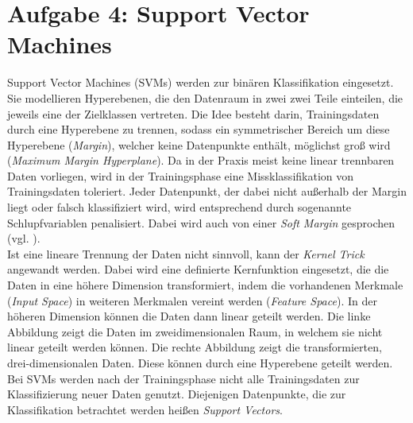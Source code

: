 \section{Aufgabe 4: Support Vector Machines}
Support Vector Machines (SVMs) werden zur binären Klassifikation eingesetzt. Sie modellieren Hyperebenen, die den Datenraum in zwei zwei Teile einteilen, die jeweils eine der Zielklassen vertreten. Die Idee besteht darin, Trainingsdaten durch eine Hyperebene zu trennen, sodass ein symmetrischer Bereich um diese Hyperebene (\emph{Margin}), welcher keine Datenpunkte enthält, möglichst groß wird (\emph{Maximum Margin Hyperplane}). Da in der Praxis meist keine linear trennbaren Daten vorliegen, wird in der Trainingsphase eine Missklassifikation von Trainingsdaten toleriert. Jeder Datenpunkt, der dabei nicht außerhalb der Margin liegt oder falsch klassifiziert wird, wird entsprechend durch sogenannte Schlupfvariablen penalisiert. Dabei wird auch von einer \emph{Soft Margin} gesprochen (vgl. \cite{2015_aggarwal}).\\
\noindent \hspace*{7mm}
Ist eine lineare Trennung der Daten nicht sinnvoll, kann der \emph{Kernel Trick} angewandt werden. Dabei wird eine definierte Kernfunktion eingesetzt, die die Daten in eine höhere Dimension transformiert, indem die vorhandenen Merkmale (\emph{Input Space}) in weiteren Merkmalen vereint werden (\emph{Feature Space}). In der höheren Dimension können die Daten dann linear geteilt werden.%
 Die linke Abbildung zeigt die Daten im zweidimensionalen Raum, in welchem sie nicht linear geteilt werden können. Die rechte Abbildung zeigt die transformierten, drei-dimensionalen Daten. Diese können durch eine Hyperebene geteilt werden.\\
\noindent \hspace*{7mm}
Bei SVMs werden nach der Trainingsphase nicht alle Trainingsdaten zur Klassifizierung neuer Daten genutzt. Diejenigen Datenpunkte, die zur Klassifikation betrachtet werden heißen \emph{Support Vectors}.
